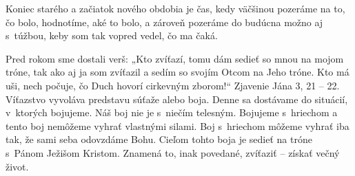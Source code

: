 







Koniec starého a začiatok nového obdobia je čas, kedy väčšinou pozeráme na to, čo bolo, hodnotíme, aké to bolo, a zároveň pozeráme do budúcna možno aj s~túžbou, keby som tak vopred vedel, čo ma čaká.

Pred rokom sme dostali verš: „Kto zvíťazí, tomu dám sedieť so mnou na mojom tróne, tak ako aj ja som zvíťazil a sedím so svojím Otcom na Jeho tróne. Kto má uši, nech počuje, čo Duch hovorí cirkevným zborom!“ Zjavenie Jána 3, 21 -- 22. Víťazstvo vyvoláva predstavu súťaže alebo boja. Denne sa dostávame do situácií, v~ktorých bojujeme. Náš boj nie je s~niečím telesným. Bojujeme s~hriechom a tento boj nemôžeme vyhrať vlastnými silami. Boj s~hriechom môžeme vyhrať iba tak, že sami seba odovzdáme Bohu. Cieľom tohto boja je sedieť na tróne s~Pánom Ježišom Kristom. Znamená to, inak povedané, zvíťaziť -- získať večný život.


